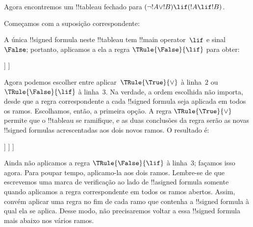 \documentclass[../../../include/open-logic-section]{subfiles}
\begin{document}
\begin{ex}
Agora encontremos um !!{tableau} fechado para $(\lnot !A \lor !B) \lif (!A
\lif !B)$.

Começamos com a suposição correspondente:
\begin{oltableau}
  [\sFmla{\False}{(\lnot \formula{A} \lor \formula{B}) \lif
      (\formula{A} \lif \formula{B})}, just=\TAss]
\end{oltableau}
A única !!{signed formula} neste !!{tableau} tem !!{main operator}~$\lif$
e sinal~$\False$; portanto, aplicamos a ela a regra $\TRule{\False}{\lif}$
para obter:
\begin{oltableau}
  [\sFmla{\False}{(\lnot \formula{A} \lor \formula{B})
      \lif (\formula{A} \lif \formula{B})}, just=\TAss, checked
    [\sFmla{\True}{\lnot \formula{A} \lor \formula{B}},
      just={\TRule{\False}{\lif}[1]}
      [\sFmla{\False}{(\formula{A} \lif \formula{B})},
        just={\TRule{\False}{\lif}[1]}
      ]
    ]
  ]
\end{oltableau}
Agora podemos escolher entre aplicar~$\TRule{\True}{\lor}$ à
linha~$2$ ou $\TRule{\False}{\lif}$ à linha~$3$. Na verdade, a ordem
escolhida não importa, desde que a regra correspondente a cada
!!{signed formula} seja aplicada em todos os ramos. Escolhamos, então,
a primeira opção. A regra $\TRule{\True}{\lor}$ permite que o
!!{tableau} se ramifique, e as duas conclusões da regra serão as novas
!!{signed formula}s acrescentadas aos dois novos ramos. O resultado é:
\begin{oltableau}
  [\sFmla{\False}{(\lnot \formula{A} \lor \formula{B}) \lif
      (\formula{A} \lif \formula{B})}, just=\TAss, checked
    [\sFmla{\True}{\lnot \formula{A} \lor \formula{B}},
      just={\TRule{\False}{\lif}[1]}, checked
      [\sFmla{\False}{(\formula{A} \lif \formula{B})},
        just={\TRule{\False}{\lif}[1]}
        [\sFmla{\True}{\lnot \formula{A}}, just={\TRule{\True}{\lor}[2]}]
        [\sFmla{\True}{\formula{B}}, just={\TRule{\True}{\lor}[2]}]
      ]
    ]
  ]
\end{oltableau}
Ainda não aplicamos a regra $\TRule{\False}{\lif}$ à linha~$3$;
façamos isso agora. Para poupar tempo, aplicamo-la aos dois ramos.
Lembre-se de que escrevemos uma marca de verificação ao lado de
!!a{signed formula} somente quando aplicamos a regra correspondente em
todos os ramos abertos. Assim, convém aplicar uma regra no fim de cada
ramo que contenha a !!{signed formula} à qual ela se aplica. Desse modo,
não precisaremos voltar a essa !!{signed formula} mais abaixo nos vários
ramos.
\begin{oltableau}

\end{oltableau}
\end{ex}
\end{document}
